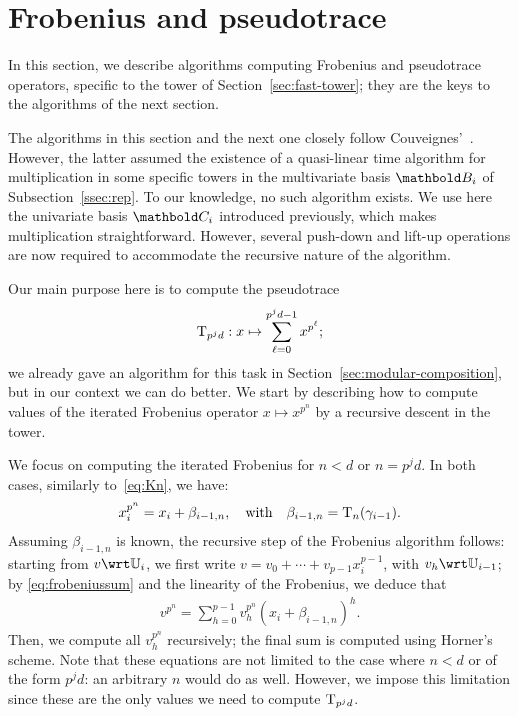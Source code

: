 

\section{Frobenius and pseudotrace}
\label{sec:pseudotrace-frobenius}

In this section, we describe algorithms computing Frobenius
and pseudotrace operators, specific to the tower of
Section~\ref{sec:fast-tower}; they are the keys to the algorithms of
the next section.

The algorithms in this section and the next one closely follow
Couveignes'~\cite{couveignes00}. However, the latter assumed the
existence of a quasi-linear time algorithm for multiplication in some
specific towers in the multivariate basis $\basis{B}_i$ of
Subsection~\ref{ssec:rep}. To our knowledge, no such algorithm
exists. We use here the univariate basis $\basis{C}_i$ introduced
previously, which makes multiplication straightforward. However,
several push-down and lift-up operations are now required to
accommodate the recursive nature of the algorithm.

Our main purpose here is to compute the pseudotrace
\begin{equation}
  \operatorname{T}_{p^jd}:x\mapsto\sum_{\ell=0}^{p^jd-1}x^{p^{\ell}}
  \text{;}  
\end{equation}
we already gave an algorithm for this task in
Section~\ref{sec:modular-composition}, but in our context we can do
better. We start by describing how to compute values of the iterated
Frobenius operator $x \mapsto x^{p^n}$ by a recursive descent in the
tower.

We focus on computing the iterated Frobenius for $n<d$ or $n=p^jd$. In
both cases, similarly to~\eqref{eq:Kn}, we have:
\begin{gather}
  \label{eq:frobeniussum}
  x_i^{p^{n}} = x_i + \beta_{i-1,n}, \quad\text{with}\quad \beta_{i-1,n}=\operatorname{T}_{n}(\gamma_{i-1}).
\end{gather}
Assuming $\beta_{i-1,n}$ is known, the recursive step of the Frobenius
algorithm follows: starting from $v\wrt\U_i$, we first write
$v=v_0+\cdots+v_{p-1}x_i^{p-1}$, with $v_h\wrt\U_{i-1}$; by
\eqref{eq:frobeniussum} and the linearity of the Frobenius, we deduce
that
\begin{equation}
  \label{eq:frobeniuscomp}
\begin{array}{c}
v^{p^n}
  =\sum_{h=0}^{p-1} v_h^{p^n} \left(x_i + \beta_{i-1,n}\right)^{h}.
\end{array}
\end{equation}
Then, we compute all $v_h^{p^n}$ recursively; the final sum is
computed using Horner's scheme. Note that these equations are not
limited to the case where $n<d$ or of the form $p^jd$: an arbitrary
$n$ would do as well. However, we impose this limitation since these
are the only values we need to compute $\operatorname{T}_{p^jd}$.


